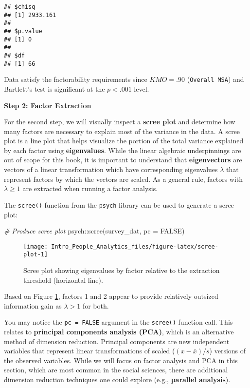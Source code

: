 \documentclass[
]{book}
\newenvironment{Shaded}{\begin{snugshade}}{\end{snugshade}}
\newcommand{\AttributeTok}[1]{\textcolor[rgb]{0.77,0.63,0.00}{#1}}
\newcommand{\CommentTok}[1]{\textcolor[rgb]{0.56,0.35,0.01}{\textit{#1}}}
\newcommand{\ConstantTok}[1]{\textcolor[rgb]{0.00,0.00,0.00}{#1}}
\newcommand{\FunctionTok}[1]{\textcolor[rgb]{0.00,0.00,0.00}{#1}}
\newcommand{\NormalTok}[1]{#1}
\newcommand{\SpecialCharTok}[1]{\textcolor[rgb]{0.00,0.00,0.00}{#1}}
\begin{document}
\begin{verbatim}
## $chisq
## [1] 2933.161
## 
## $p.value
## [1] 0
## 
## $df
## [1] 66
\end{verbatim}

Data satisfy the factorability requirements since \(KMO = .90\) (\texttt{Overall\ MSA}) and Bartlett's test is significant at the \(p < .001\) level.

\textbf{Step 2: Factor Extraction}

For the second step, we will visually inspect a \textbf{scree plot} and determine how many factors are necessary to explain most of the variance in the data. A scree plot is a line plot that helps visualize the portion of the total variance explained by each factor using \textbf{eigenvalues}. While the linear algebraic underpinnings are out of scope for this book, it is important to understand that \textbf{eigenvectors} are vectors of a linear transformation which have corresponding eigenvalues \(\lambda\) that represent factors by which the vectors are scaled. As a general rule, factors with \(\lambda \ge 1\) are extracted when running a factor analysis.

The \texttt{scree()} function from the \texttt{psych} library can be used to generate a scree plot:

\begin{Shaded}
\begin{Highlighting}[]
\CommentTok{\# Produce scree plot}
\NormalTok{psych}\SpecialCharTok{::}\FunctionTok{scree}\NormalTok{(survey\_dat, }\AttributeTok{pc =} \ConstantTok{FALSE}\NormalTok{)}
\end{Highlighting}
\end{Shaded}

\begin{figure}

{\centering \texttt{[image: Intro\_People\_Analytics\_files/figure-latex/scree-plot-1]} 

}

\caption{Scree plot showing eigenvalues by factor relative to the extraction threshold (horizontal line).}\label{fig:scree-plot}
\end{figure}

Based on Figure \ref{fig:scree-plot}, factors 1 and 2 appear to provide relatively outsized information gain as \(\lambda > 1\) for both.

You may notice the \texttt{pc\ =\ FALSE} argument in the \texttt{scree()} function call. This relates to \textbf{principal components analysis (PCA)}, which is an alternative method of dimension reduction. Principal components are new independent variables that represent linear transformations of scaled (\((x - \bar{x}) / s\)) versions of the observed variables. While we will focus on factor analysis and PCA in this section, which are most common in the social sciences, there are additional dimension reduction techniques one could explore (e.g., \textbf{parallel analysis}).
\end{document}
